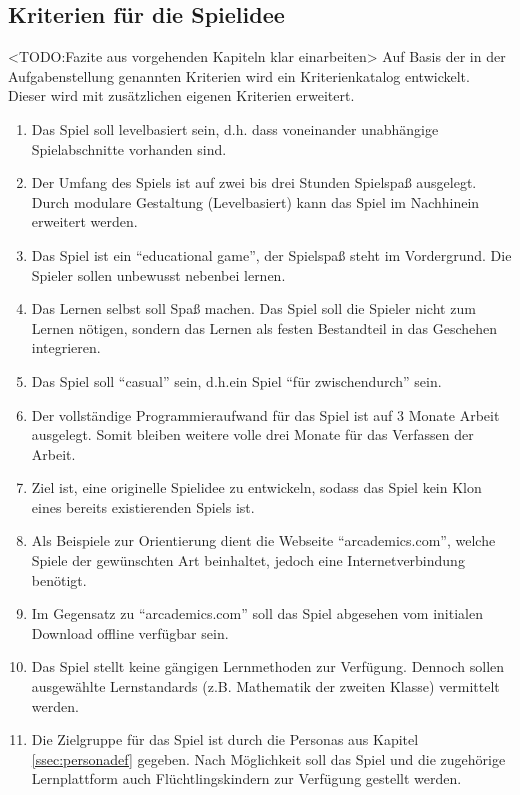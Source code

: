 \subsection{Kriterien für die Spielidee}\label{ssec:kriterien}
	<TODO:Fazite aus vorgehenden Kapiteln klar einarbeiten>
	Auf Basis der in der Aufgabenstellung genannten Kriterien wird ein Kriterienkatalog entwickelt. Dieser wird mit zusätzlichen eigenen Kriterien erweitert.
	\begin{enumerate}
		\item{Das Spiel soll levelbasiert sein, d.h. dass voneinander unabhängige Spielabschnitte vorhanden sind.}
		\item{Der Umfang des Spiels ist auf zwei bis drei Stunden Spielspaß ausgelegt. Durch modulare Gestaltung (Levelbasiert) kann das Spiel im Nachhinein erweitert werden.}
		\item{Das Spiel ist ein \enquote{educational game}, der Spielspaß steht im Vordergrund. Die Spieler sollen unbewusst nebenbei lernen.}
		\item{Das Lernen selbst soll Spaß machen. Das Spiel soll die Spieler nicht zum Lernen nötigen, sondern das Lernen als festen Bestandteil in das Geschehen integrieren.}
		\item{Das Spiel soll \enquote{casual} sein, d.h.\@ ein Spiel \enquote{für zwischendurch} sein.}
		\item{Der vollständige Programmieraufwand für das Spiel ist auf 3 Monate Arbeit ausgelegt. Somit bleiben weitere volle drei Monate für das Verfassen der Arbeit.}
		\item{Ziel ist, eine originelle Spielidee zu entwickeln, sodass das Spiel kein Klon eines bereits existierenden Spiels ist.}
		\item{Als Beispiele zur Orientierung dient die Webseite \enquote{arcademics.com}, welche Spiele der gewünschten Art beinhaltet, jedoch eine Internetverbindung benötigt. }
		\item{Im Gegensatz zu \enquote{arcademics.com} soll das Spiel abgesehen vom initialen Download offline verfügbar sein.}
		\item{Das Spiel stellt keine gängigen Lernmethoden zur Verfügung. Dennoch sollen ausgewählte Lernstandards (z.B. Mathematik der zweiten Klasse) vermittelt werden.}
		\item{Die Zielgruppe für das Spiel ist durch die Personas aus Kapitel \ref{ssec:personadef} gegeben. Nach Möglichkeit soll das Spiel und die zugehörige Lernplattform auch Flüchtlingskindern zur Verfügung gestellt werden.}
	\end{enumerate}

